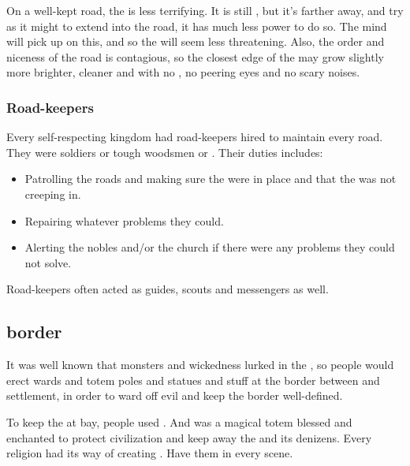 On a well-kept road, the \Wylde{} is less terrifying. It is still \Wylde{}, but it's farther away, and try as it might to extend into the road, it has much less power to do so. The mind will pick up on this, and so the \Wylde{} will seem less threatening. Also, the order and niceness of the road is contagious, so the closest edge of the \Wylde{} may grow slightly more \dash brighter, cleaner and with no \wildfog{}, no peering eyes and no scary noises. 





\subsubsection{Road-keepers}
Every self-respecting kingdom had road-keepers hired to maintain every road. 
They were soldiers or tough woodsmen or \rangers.
Their duties includes:
\begin{itemize}
  \item 
    Patrolling the roads and making sure the \eidola were in place and that the \wylde was not creeping in.
  \item 
    Repairing whatever problems they could.
  \item 
    Alerting the nobles and/or the church if there were any problems they could not solve. 
\end{itemize}

Road-keepers often acted as guides, scouts and messengers as well. 










\subsection{\Wylde{} border}
It was well known that monsters and wickedness lurked in the \wylde, so people would erect wards and totem poles and statues and stuff at the border between \wylde{} and settlement, in order to ward off evil and keep the border well-defined. 

To keep the \wylde at bay, people used \eidola. 
And \eidolon was a magical totem blessed and enchanted to protect civilization and keep away the \wylde and its denizens. 
Every religion had its way of creating \eidola. 
Have them in every \wylde scene. 

